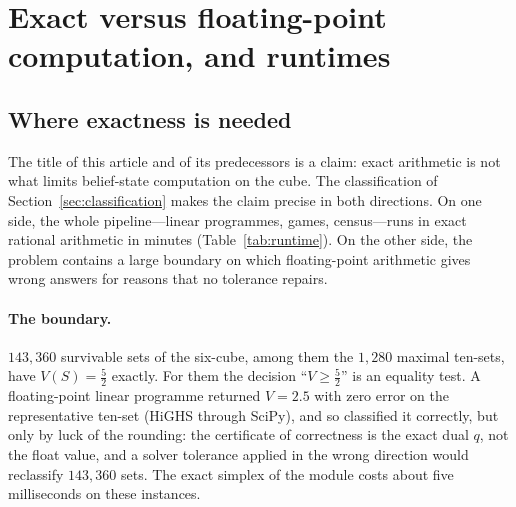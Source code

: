 \documentclass[11pt,a4paper]{article}
\theoremstyle{plain}
\theoremstyle{definition}
\theoremstyle{remark}
\newcommand{\tfr}[2]{\tfrac{#1}{#2}}
\begin{document}
\section{Exact versus floating-point computation, and runtimes}\label{sec:float}

\subsection{Where exactness is needed}
The title of this article and of its predecessors is a claim: exact arithmetic is not what limits belief-state computation on the cube. The classification of Section~\ref{sec:classification} makes the claim precise in both directions. On one side, the whole pipeline---linear programmes, games, census---runs in exact rational arithmetic in minutes (Table~\ref{tab:runtime}). On the other side, the problem contains a large boundary on which floating-point arithmetic gives wrong answers for reasons that no tolerance repairs.

\paragraph{The boundary.}
$143{,}360$ survivable sets of the six-cube, among them the $1{,}280$ maximal ten-sets, have $V(S)=\tfr52$ exactly. For them the decision ``$V\ge\tfr52$'' is an equality test. A floating-point linear programme returned $V=2.5$ with zero error on the representative ten-set (HiGHS \cite{HuangfuHall2018} through SciPy), and so classified it correctly, but only by luck of the rounding: the certificate of correctness is the exact dual $q$, not the float value, and a solver tolerance applied in the wrong direction would reclassify $143{,}360$ sets. The exact simplex of the module costs about five milliseconds on these instances.
\end{document}
